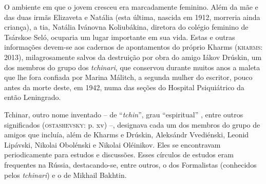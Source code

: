 O ambiente em que o jovem cresceu era marcadamente feminino. Além da mãe
e das duas irmãs Elizaveta e Natália (esta última, nascida em 1912,
morreria ainda criança), a tia, Natália Ivánovna Koliubákina, diretora
do colégio feminino de Tsárskoe Seló, ocuparia um lugar importante em
sua vida. Estas e outras informações devem-se aos cadernos de
apontamentos do próprio Kharms (\textsc{kharms}: 2013), milagrosamente
salvos da destruição por obra do amigo Iákov Drúskin, um dos membros do
grupo dos \emph{tchinari}, que conservou durante muitos anos a maleta
que lhe fora confiada por Marina Málitch, a segunda mulher do escritor,
pouco antes da morte deste, em 1942, numa das seções do Hospital
Psiquiátrico da então Leningrado.

Tchinar, outro nome inventado -- de ``\emph{tchin}'', grau
``espiritual'' , entre outros significados (\textsc{ostashevsky}: p. xv)
--, designava cada um dos membros do grupo de amigos que incluía, além
de Kharms e Drúskin, Aleksándr Vvediénski, Leonid Lipávski, Nikolai
Obolénski e Nikolai Oléinikov. Eles se encontravam periodicamente para
estudos e discussões. Esses círculos de estudos eram frequentes na
Rússia, destacando-se, entre outros, o dos Formalistas (conhecidos pelos
\emph{tchinari}) e o de Mikhail Bakhtin.

